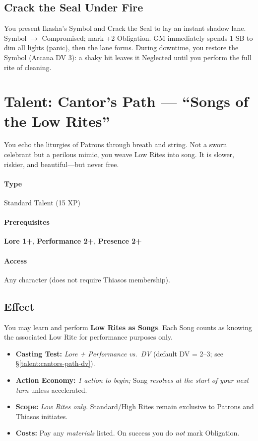 \subsection*{Crack the Seal Under Fire}
You present Ikasha's Symbol and Crack the Seal to lay an instant shadow lane. Symbol $\rightarrow$ Compromised; mark +2 Obligation. GM immediately spends 1 SB to dim all lights (panic), then the lane forms. During downtime, you restore the Symbol (Arcana DV 3): a shaky hit leaves it Neglected until you perform the full rite of cleaning.

\section{Talent: Cantor's Path --- ``Songs of the Low Rites''}
\label{talent:cantors-path}

\begin{tcolorbox}[colback=black!3,colframe=black!40!white,title={Cantor's Path}]
You echo the liturgies of Patrons through breath and string. Not a sworn celebrant but a perilous mimic, you weave Low Rites into song. It is slower, riskier, and beautiful---but never free.
\end{tcolorbox}

\paragraph*{Type} Standard Talent (15 XP) \quad
\paragraph*{Prerequisites} \textbf{Lore 1+}, \textbf{Performance 2+}, \textbf{Presence 2+} \quad
\paragraph*{Access} Any character (does not require Thiasos membership).

\subsection*{Effect}
You may learn and perform \textbf{Low Rites as Songs}. Each Song counts as knowing the associated Low Rite for performance purposes only.

\begin{itemize}
\item \textbf{Casting Test:} \emph{Lore + Performance vs.\ DV} (default DV = 2--3; see \S\ref{talent:cantors-path-dv}).
\item \textbf{Action Economy:} \emph{1 action to begin;} Song \emph{resolves at the start of your next turn} unless accelerated.
\item \textbf{Scope:} \emph{Low Rites only.} Standard/High Rites remain exclusive to Patrons and Thiasos initiates.
\item \textbf{Costs:} Pay any \emph{materials} listed. On success you do \emph{not} mark Obligation.
\end{itemize}

